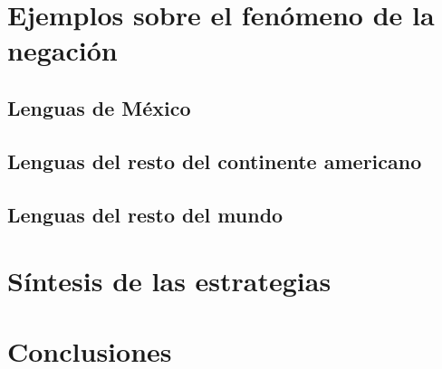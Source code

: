 \documentclass[12pt,letterpaper]{report}
\begin{document}

\tableofcontents



\part{Ejemplos sobre el fenómeno de la negación}
\chapter{Lenguas de México}


























\chapter{Lenguas del resto del continente americano}




















\chapter{Lenguas del resto del mundo}















\part{Síntesis de las estrategias}




\part{Conclusiones}


\end{document}
